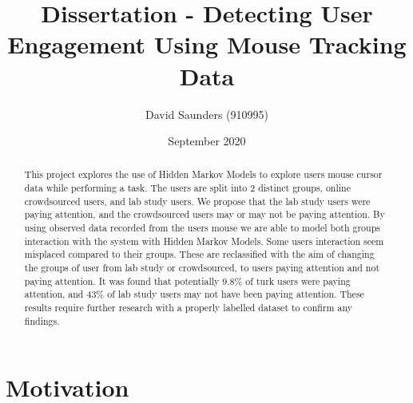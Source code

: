 \documentclass{article}
\title{Dissertation - Detecting User Engagement Using Mouse Tracking Data}
\author{David Saunders (910995)}
\date{September 2020}
\begin{document}
\maketitle

\begin{abstract} 
    This project explores the use of Hidden Markov Models to explore users mouse cursor data while performing a task.
    The users are split into 2 distinct groups, online crowdsourced users, and lab study users.
    We propose that the lab study users were paying attention, and the crowdsourced users may or may not be paying attention.
    By using observed data recorded from the users mouse we are able to model both groups interaction with the system with Hidden Markov Models.
    Some users interaction seem misplaced compared to their groups.
    These are reclassified with the aim of changing the groups of user from lab study or crowdsourced, to users paying attention and not paying attention.     
    It was found that potentially 9.8\% of turk users were paying attention, and 43\% of lab study users may not have been paying attention.
    These results require further research with a properly labelled dataset to confirm any findings.

\end{abstract}

\tableofcontents



\section{Motivation}





\end{document}
